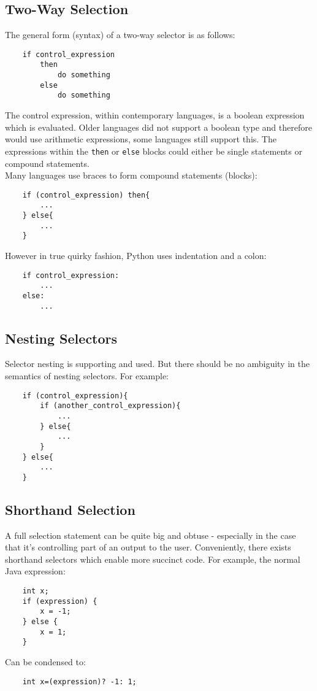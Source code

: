 \subsection{Two-Way Selection}
The general form (syntax) of a two-way selector is as follows:
\begin{verbatim}
    if control_expression
        then
            do something
        else
            do something
\end{verbatim}
The control expression, within contemporary languages, is a boolean expression which is evaluated. Older languages did not support a boolean type and therefore would use arithmetic expressions, some languages still support this. The expressions within the \verb|then| or \verb|else| blocks could either be single statements or compound statements.\\

Many languages use braces to form compound statements (blocks):
\begin{verbatim}
    if (control_expression) then{
        ...
    } else{
        ...
    }
\end{verbatim}

However in true quirky fashion, Python uses indentation and a colon:
\begin{verbatim}
    if control_expression:
        ...
    else:
        ...
\end{verbatim}

\subsection{Nesting Selectors}
Selector nesting is supporting and used. But there should be no ambiguity in the semantics of nesting selectors. For example:
\begin{verbatim}
    if (control_expression){
        if (another_control_expression){
            ...
        } else{
            ...
        }
    } else{
        ...
    }
\end{verbatim}

\subsection{Shorthand Selection}
A full selection statement can be quite big and obtuse - especially in the case that it's controlling part of an output to the user. Conveniently, there exists shorthand selectors which enable more succinct code. For example, the normal Java expression:
\begin{verbatim}
    int x;
    if (expression) {
        x = -1;
    } else {
        x = 1;
    }
\end{verbatim}
Can be condensed to:
\begin{verbatim}
    int x=(expression)? -1: 1;
\end{verbatim}

